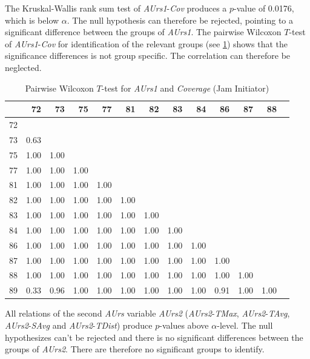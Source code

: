 The Kruskal-Wallis rank sum test of \textit{AUrs1}-\textit{Cov} produces a $p$-value of 0.0176, which is below $\alpha$. The null hypothesis can therefore be rejected, pointing to a significant difference between the groups of \textit{AUrs1}. The pairwise Wilcoxon $T$-test of \textit{AUrs1}-\textit{Cov} for identification of the relevant groups (see \cref{tbl:wilcoxon_baysis_initiator_AUrs1_Cov}) shows that the significance differences is not group specific. The correlation can therefore be neglected.
\begin{table}[ht!]
	\small
	\centering
    \begin{tabular}{rrrrrrrrrrrrr}
        \toprule
           & 72 & 73 & 75 & 77 & 81 & 82 & 83 & 84 & 86 & 87 & 88 \\ 
        \midrule
        72 &  &  &  &  &  &  &  &  &  &  &  \\ 
        73 & 0.63 &  &  &  &  &  &  &  &  &  &  \\ 
        75 & 1.00 & 1.00 &  &  &  &  &  &  &  &  &  \\ 
        77 & 1.00 & 1.00 & 1.00 &  &  &  &  &  &  &  &  \\ 
        81 & 1.00 & 1.00 & 1.00 & 1.00 &  &  &  &  &  &  &  \\ 
        82 & 1.00 & 1.00 & 1.00 & 1.00 & 1.00 &  &  &  &  &  &  \\ 
        83 & 1.00 & 1.00 & 1.00 & 1.00 & 1.00 & 1.00 &  &  &  &  &  \\ 
        84 & 1.00 & 1.00 & 1.00 & 1.00 & 1.00 & 1.00 & 1.00 &  &  &  &  \\ 
        86 & 1.00 & 1.00 & 1.00 & 1.00 & 1.00 & 1.00 & 1.00 & 1.00 &  &  &  \\ 
        87 & 1.00 & 1.00 & 1.00 & 1.00 & 1.00 & 1.00 & 1.00 & 1.00 & 1.00 &  &  \\ 
        88 & 1.00 & 1.00 & 1.00 & 1.00 & 1.00 & 1.00 & 1.00 & 1.00 & 1.00 & 1.00 &  \\ 
        89 & 0.33 & 0.96 & 1.00 & 1.00 & 1.00 & 1.00 & 1.00 & 1.00 & 0.91 & 1.00 & 1.00 \\ 
        \bottomrule
    \end{tabular}
    \caption{Pairwise Wilcoxon $T$-test for \textit{AUrs1} and \textit{Coverage} (Jam Initiator)}
    \label{tbl:wilcoxon_baysis_initiator_AUrs1_Cov}
\end{table}

\medskip
All relations of the second \textit{AUrs} variable \textit{AUrs2} (\textit{AUrs2}-\textit{TMax}, \textit{AUrs2}-\textit{TAvg}, \textit{AUrs2}-\textit{SAvg} and \textit{AUrs2}-\textit{TDist}) produce $p$-values above $\alpha$-level. The null hypothesizes can't be rejected and there is no significant differences between the groups of \textit{AUrs2}. There are therefore no significant groups to identify.

